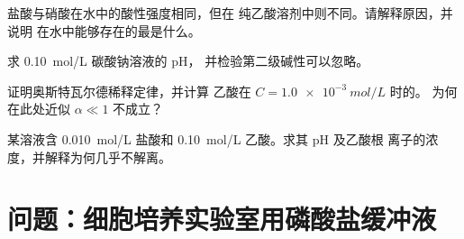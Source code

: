 \begin{exercise}[$\star\star$]\label{exo:b1:predominant-reaction:9}
盐酸与硝酸在水中的酸性强度相同，但在
纯乙酸溶剂中则不同。请解释原因，并说明
在水中能够存在的最是什么。
\end{exercise}

\begin{exercise}[$\star\star\star$]\label{exo:b1:predominant-reaction:10}
求 \qty{0.10}{mol/L} 碳酸钠溶液的 pH，
并检验第二级碱性可以忽略。
\end{exercise}

\begin{exercise}[$\star\star\star$]\label{exo:b1:predominant-reaction:11}
证明奥斯特瓦尔德稀释定律，并计算
乙酸在 $C = \qty{1.0e-3}{mol/L}$ 时的。
为何在此处近似 $\alpha \ll 1$ 不成立？
\end{exercise}

\begin{exercise}[$\star\star\star$]\label{exo:b1:predominant-reaction:12}
某溶液含 \qty{0.010}{mol/L} 盐酸和
\qty{0.10}{mol/L} 乙酸。求其 pH 及乙酸根
离子的浓度，并解释为何几乎不解离。
\end{exercise}

\section{问题：细胞培养实验室用磷酸盐缓冲液}

